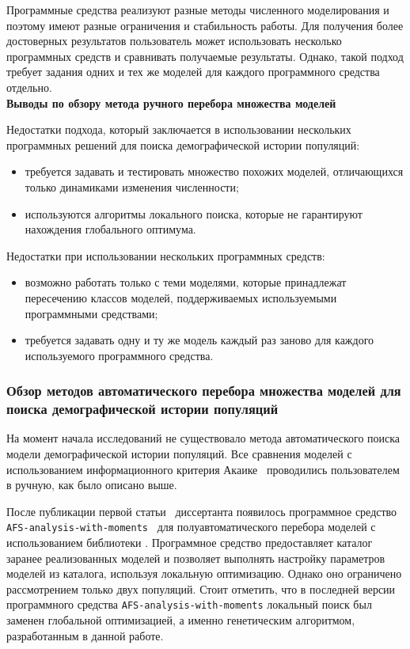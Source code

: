 \documentclass[a4paper,14pt,oneside,openany,article]{memoir}
\begin{document}
Программные средства реализуют разные методы численного моделирования и поэтому имеют разные ограничения и стабильность работы.
Для получения более достоверных результатов пользователь может использовать несколько программных средств и сравнивать получаемые результаты.
Однако, такой подход требует задания одних и тех же моделей для каждого программного средства отдельно.\\

\newpage
\textbf{Выводы по обзору метода ручного перебора множества моделей}

Недостатки подхода, который заключается в использовании нескольких программных решений для поиска демографической истории популяций:
\begin{itemize}
    \item требуется задавать и тестировать множество похожих моделей, отличающихся только динамиками изменения численности;
    \item используются алгоритмы локального поиска, которые не гарантируют нахождения глобального оптимума.\\
\end{itemize}

Недостатки при использовании нескольких программных средств:
\begin{itemize}
\item возможно работать только с теми моделями, которые принадлежат пересечению классов моделей, поддерживаемых используемыми программными средствами;
\item требуется задавать одну и ту же модель каждый раз заново для каждого используемого программного средства.
\end{itemize}

\subsubsection*{Обзор методов автоматического перебора множества моделей для поиска демографической истории популяций}

На момент начала исследований не существовало метода автоматического поиска модели демографической истории популяций.
Все сравнения моделей с использованием информационного критерия Акаике~ проводились пользователем в ручную, как было описано выше.

После публикации первой статьи~ диссертанта появилось программное средство \texttt{AFS-analysis-with-moments}~ для полуавтоматического перебора моделей с использованием библиотеки \moments.
Программное средство предоставляет каталог заранее реализованных моделей и позволяет выполнять настройку параметров моделей из каталога, используя локальную оптимизацию.
Однако оно ограничено рассмотрением только двух популяций.
Стоит отметить, что в последней версии программного средства \texttt{AFS-analysis-with-moments} локальный поиск был заменен глобальной оптимизацией, а именно генетическим алгоритмом, разработанным в данной работе.
\end{document}
